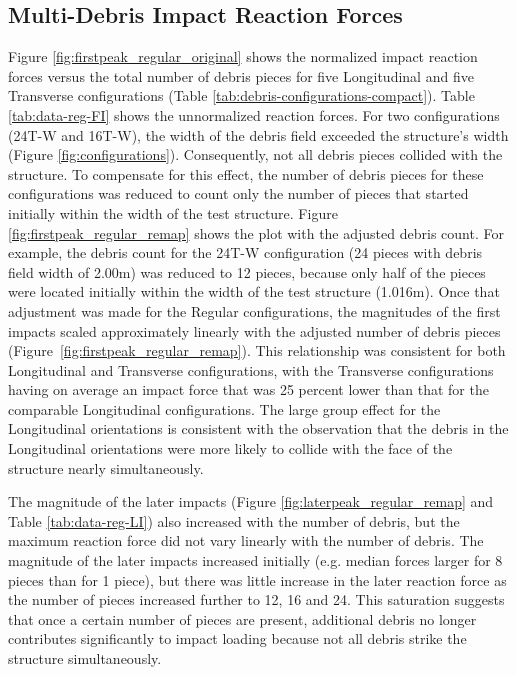 \documentclass[10pt,a4paper]{article}
\begin{document}
\subsection*{Multi-Debris Impact Reaction Forces}

Figure \ref{fig:firstpeak_regular_original} shows the normalized impact reaction forces versus the total number of debris pieces for five Longitudinal and five Transverse configurations (Table \ref{tab:debris-configurations-compact}). Table \ref{tab:data-reg-FI} shows the unnormalized reaction forces. For two configurations (24T-W and 16T-W), the width of the debris field exceeded the structure’s width (Figure \ref{fig:configurations}). Consequently, not all debris pieces collided with the structure. To compensate for this effect, the number of debris pieces for these configurations was reduced to count only the number of pieces that started initially within the width of the test structure.  Figure \ref{fig:firstpeak_regular_remap} shows the plot with the adjusted debris count. For example, the debris count for the 24T-W configuration (24 pieces with debris field width of 2.00m) was reduced to 12 pieces, because only half of the pieces were located initially within the width of the test structure (1.016m).
Once that adjustment was made for the Regular configurations, the magnitudes of the first impacts scaled approximately linearly with the adjusted number of debris pieces (Figure~\ref{fig:firstpeak_regular_remap}). This relationship was consistent for both Longitudinal and Transverse configurations, with the Transverse configurations having on average an impact force that was 25 percent lower than that for the comparable Longitudinal configurations. The large group effect for the Longitudinal orientations is consistent with the observation that the debris in the Longitudinal orientations were more likely to collide with the face of the structure nearly simultaneously. 

The magnitude of the later impacts (Figure \ref{fig:laterpeak_regular_remap} and Table \ref{tab:data-reg-LI}) also increased with the number of debris, but the maximum reaction force did not vary linearly with the number of debris. The magnitude of the later impacts increased initially (e.g. median forces larger for 8 pieces than for 1 piece), but there was little increase in the later reaction force as the number of pieces increased further to 12, 16 and 24. This saturation suggests that once a certain number of pieces are present, additional debris no longer contributes significantly to impact loading because not all debris strike the structure simultaneously. 
\end{document}
